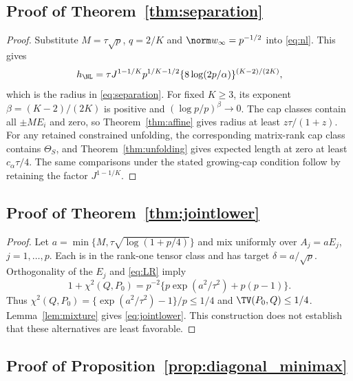 \subsection{Proof of Theorem~\ref{thm:separation}}

\begin{proof}
Substitute $M=\tau\sqrt p$, $q=2/K$ and $\norm w_\infty=p^{-1/2}$ into \eqref{eq:nl}. This gives
\[
 h_{\NL}=\tau J^{1-1/K}
 p^{1/K-1/2}\{8\log(2p/\alpha)\}^{(K-2)/(2K)},
\]
which is the radius in \eqref{eq:separation}. For fixed $K\ge3$, its exponent $\beta=(K-2)/(2K)$ is positive and $(\log p/p)^\beta\to0$. The cap classes contain all $\pm M E_i$ and zero, so Theorem~\ref{thm:affine} gives radius at least $z\tau/(1+z)$. For any retained constrained unfolding, the corresponding matrix-rank cap class contains $\Theta_S$, and Theorem~\ref{thm:unfolding} gives expected length at zero at least $c_\alpha\tau/4$. The same comparisons under the stated growing-cap condition follow by retaining the factor $J^{1-1/K}$.
\end{proof}

\subsection{Proof of Theorem~\ref{thm:jointlower}}

\begin{proof}
Let $a=\min\{M,\tau\sqrt{\log(1+p/4)}\}$ and mix uniformly over $A_j=aE_j$, $j=1,\ldots,p$. Each is in the rank-one tensor class and has target $\delta=a/\sqrt p$. Orthogonality of the $E_j$ and \eqref{eq:LR} imply
\[
 1+\chi^2(Q,P_0)=p^{-2}\{p\exp(a^2/\tau^2)+p(p-1)\}.
\]
Thus $\chi^2(Q,P_0)=\{\exp(a^2/\tau^2)-1\}/p\le1/4$ and $\TV(P_0,Q)\le1/4$. Lemma~\ref{lem:mixture} gives \eqref{eq:jointlower}. This construction does not establish that these alternatives are least favorable.
\end{proof}


\subsection{Proof of Proposition~\ref{prop:diagonal_minimax}}

